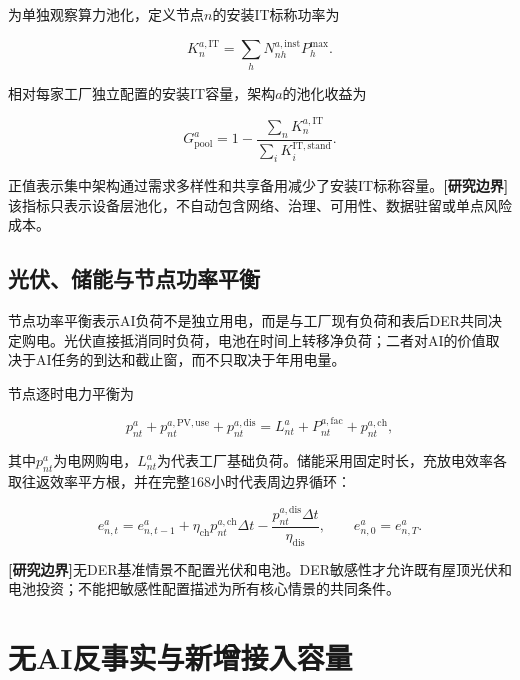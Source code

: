 \documentclass[preprint]{elsarticle}
\newcommand{\boundary}{\textcolor{black!65}{\textbf{[研究边界]}}}
\begin{document}
为单独观察算力池化，定义节点$n$的安装IT标称功率为

\begin{equation}
 K^{a,\mathrm{IT}}_n=\sum_hN^{a,\mathrm{inst}}_{nh}P_h^{\max}.
 \label{eq:installed-it-capacity}
\end{equation}

相对每家工厂独立配置的安装IT容量，架构$a$的池化收益为

\begin{equation}
 G^a_{\mathrm{pool}}
 =1-\frac{\sum_nK^{a,\mathrm{IT}}_n}
 {\sum_iK^{\mathrm{IT,stand}}_i}.
 \label{eq:pooling-gain}
\end{equation}

正值表示集中架构通过需求多样性和共享备用减少了安装IT标称容量。\boundary 该指标只表示设备层池化，不自动包含网络、治理、可用性、数据驻留或单点风险成本。

\subsection{光伏、储能与节点功率平衡}

节点功率平衡表示AI负荷不是独立用电，而是与工厂现有负荷和表后DER共同决定购电。光伏直接抵消同时负荷，电池在时间上转移净负荷；二者对AI的价值取决于AI任务的到达和截止窗，而不只取决于年用电量。

节点逐时电力平衡为

\begin{equation}
 p^a_{nt}+p^{a,\mathrm{PV,use}}_{nt}+p^{a,\mathrm{dis}}_{nt}
 =L^a_{nt}+P^{a,\mathrm{fac}}_{nt}+p^{a,\mathrm{ch}}_{nt},
 \label{eq:power-balance}
\end{equation}

其中$p^a_{nt}$为电网购电，$L^a_{nt}$为代表工厂基础负荷。储能采用固定时长，充放电效率各取往返效率平方根，并在完整168小时代表周边界循环：

\begin{equation}
 e^a_{n,t}=e^a_{n,t-1}
 +\eta_{\mathrm{ch}}p^{a,\mathrm{ch}}_{nt}\Delta t
 -\frac{p^{a,\mathrm{dis}}_{nt}\Delta t}{\eta_{\mathrm{dis}}},
 \qquad e^a_{n,0}=e^a_{n,T}.
 \label{eq:battery-balance}
\end{equation}

\boundary 无DER基准情景不配置光伏和电池。DER敏感性才允许既有屋顶光伏和电池投资；不能把敏感性配置描述为所有核心情景的共同条件。

\section{无AI反事实与新增接入容量}
\end{document}
